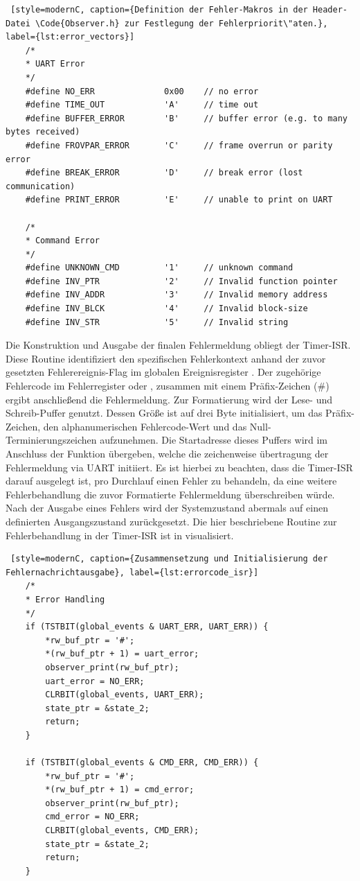 \newpage
\begin{lstlisting} [style=modernC, caption={Definition der Fehler-Makros in der Header-Datei \Code{Observer.h} zur Festlegung der Fehlerpriorit\"aten.}, label={lst:error_vectors}]
	/*
	* UART Error
	*/
	#define NO_ERR              0x00    // no error
	#define TIME_OUT            'A'     // time out
	#define BUFFER_ERROR        'B'     // buffer error (e.g. to many bytes received)
	#define FROVPAR_ERROR       'C'     // frame overrun or parity error
	#define BREAK_ERROR         'D'     // break error (lost communication)
	#define PRINT_ERROR         'E'     // unable to print on UART
	
	/*
	* Command Error
	*/
	#define UNKNOWN_CMD         '1'     // unknown command
	#define INV_PTR             '2'     // Invalid function pointer
	#define INV_ADDR            '3'     // Invalid memory address
	#define INV_BLCK            '4'     // Invalid block-size
	#define INV_STR             '5'     // Invalid string
\end{lstlisting}

Die Konstruktion und Ausgabe der finalen Fehlermeldung obliegt der Timer-ISR. Diese Routine identifiziert den spezifischen Fehlerkontext anhand der zuvor gesetzten Fehlerereignis-Flag im globalen Ereignisregister . Der zugeh\"orige Fehlercode im Fehlerregister  oder , zusammen mit einem Pr\"afix-Zeichen (\glqq{}\#\grqq{}) ergibt anschlie{\ss}end die Fehlermeldung. Zur Formatierung wird der Lese- und Schreib-Puffer  genutzt. Dessen Gr\"o{\ss}e ist auf drei Byte initialisiert, um das Pr\"afix-Zeichen, den alphanumerischen Fehlercode-Wert und das Null-Terminierungszeichen aufzunehmen. Die Startadresse dieses Puffers wird im Anschluss der Funktion  \"ubergeben, welche die zeichenweise \"ubertragung der Fehlermeldung via UART initiiert. Es ist hierbei zu beachten, dass die Timer-ISR darauf ausgelegt ist, pro Durchlauf einen Fehler zu behandeln, da eine weitere Fehlerbehandlung die zuvor Formatierte Fehlermeldung \"uberschreiben w\"urde. Nach der Ausgabe eines Fehlers wird der Systemzustand abermals auf einen definierten Ausgangszustand zur\"uckgesetzt. Die hier beschriebene Routine zur Fehlerbehandlung in der Timer-ISR ist in  visualisiert.

\newpage
\begin{lstlisting} [style=modernC, caption={Zusammensetzung und Initialisierung der Fehlernachrichtausgabe}, label={lst:errorcode_isr}]
    /*
    * Error Handling
    */
	if (TSTBIT(global_events & UART_ERR, UART_ERR)) {
		*rw_buf_ptr = '#';
		*(rw_buf_ptr + 1) = uart_error;
		observer_print(rw_buf_ptr);
		uart_error = NO_ERR;
		CLRBIT(global_events, UART_ERR);
		state_ptr = &state_2;
		return;
	}
	
	if (TSTBIT(global_events & CMD_ERR, CMD_ERR)) {
		*rw_buf_ptr = '#';
		*(rw_buf_ptr + 1) = cmd_error;
		observer_print(rw_buf_ptr);
		cmd_error = NO_ERR;
		CLRBIT(global_events, CMD_ERR);
		state_ptr = &state_2;
		return;
	}
\end{lstlisting}

